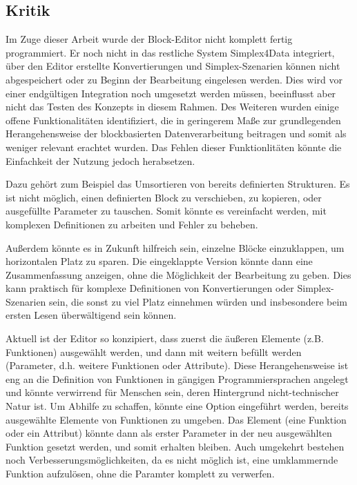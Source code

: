 \subsection{Kritik}

Im Zuge dieser Arbeit wurde der Block-Editor nicht komplett fertig programmiert. Er noch nicht in das restliche System Simplex4Data integriert, über den Editor erstellte Konvertierungen und Simplex-Szenarien können nicht abgespeichert oder zu Beginn der Bearbeitung eingelesen werden. Dies wird vor einer endgültigen Integration noch umgesetzt werden müssen, beeinflusst aber nicht das Testen des Konzepts in diesem Rahmen. Des Weiteren wurden einige offene Funktionalitäten identifiziert, die in geringerem Maße zur grundlegenden Herangehensweise der blockbasierten Datenverarbeitung beitragen und somit als weniger relevant erachtet wurden. Das Fehlen dieser Funktionlitäten könnte die Einfachkeit der Nutzung jedoch herabsetzen.

Dazu gehört zum Beispiel das Umsortieren von bereits definierten Strukturen. Es ist nicht möglich, einen definierten Block zu verschieben, zu kopieren, oder ausgefüllte Parameter zu tauschen. Somit könnte es vereinfacht werden, mit komplexen Definitionen zu arbeiten und Fehler zu beheben.

Außerdem könnte es in Zukunft hilfreich sein, einzelne Blöcke einzuklappen, um horizontalen Platz zu sparen. Die eingeklappte Version könnte dann eine Zusammenfassung anzeigen, ohne die Möglichkeit der Bearbeitung zu geben. Dies kann praktisch für komplexe Definitionen von Konvertierungen oder Simplex-Szenarien sein, die sonst zu viel Platz einnehmen würden und insbesondere beim ersten Lesen überwältigend sein können.

Aktuell ist der Editor so konzipiert, dass zuerst die äußeren Elemente (z.B. Funktionen) ausgewählt werden, und dann mit weitern befüllt werden (Parameter, d.h. weitere Funktionen oder Attribute). Diese Herangehensweise ist eng an die Definition von Funktionen in gängigen Programmiersprachen angelegt und könnte verwirrend für Menschen sein, deren Hintergrund nicht-technischer Natur ist. Um Abhilfe zu schaffen, könnte eine Option eingeführt werden, bereits ausgewählte Elemente von Funktionen zu umgeben. Das Element (eine Funktion oder ein Attribut)  könnte dann als erster Parameter in der neu ausgewählten Funktion gesetzt werden, und somit erhalten bleiben. Auch umgekehrt bestehen noch Verbesserungsmöglichkeiten, da es nicht möglich ist, eine umklammernde Funktion aufzulösen, ohne die Paramter komplett zu verwerfen.

